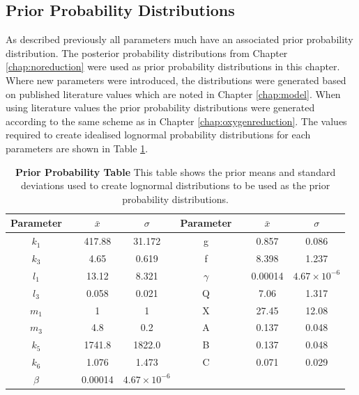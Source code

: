 \subsection{Prior Probability Distributions}

As described previously all parameters much have an associated prior probability distribution. The posterior probability distributions from Chapter \ref{chap:noreduction} were used as prior probability distributions in this chapter. Where new parameters were introduced, the distributions were generated based on published literature values which are noted in Chapter \ref{chap:model}. When using literature values the prior probability distributions were generated according to the same scheme as in Chapter \ref{chap:oxygenreduction}. The values required to create idealised lognormal probability distributions for each parameters are shown in Table \ref{tab:nitrite_prior_table}.

\begin{table}[ht]%
\renewcommand{\arraystretch}{1.5}
\begin{center}
\begin{tabular}{cccc|cccc}
\toprule
\textbf{Parameter} && ${\bar{x}}$ & $\sigma$ & \textbf{Parameter} && ${\bar{x}}$ & $\sigma$\\
\midrule
$k_1$ && 417.88 & 31.172 & g && 0.857 & 0.086\\
$k_3$ && 4.65 & 0.619 & f && 8.398 & 1.237\\
$l_1$ && 13.12 & 8.321 & $\gamma$ && 0.00014 & $4.67\times 10^{-6}$\\
$l_3$ && 0.058 & 0.021 & Q && 7.06 & 1.317\\
$m_1$ && 1 & 1 & X && 27.45 & 12.08\\
$m_3$ && 4.8 & 0.2 & A && 0.137 & 0.048\\
$k_5$ && 1741.8 & 1822.0 & B && 0.137 & 0.048\\
$k_6$ && 1.076 & 1.473 & C && 0.071 & 0.029\\
$\beta$ && 0.00014 & $4.67\times 10^{-6}$\\
\bottomrule
\end{tabular}
\end{center}
\caption[Prior Probability Table]{{\bf Prior Probability Table} This table shows the prior means and standard deviations used to create lognormal distributions to be used as the prior probability distributions.
\label{tab:nitrite_prior_table}}
\end{table}

